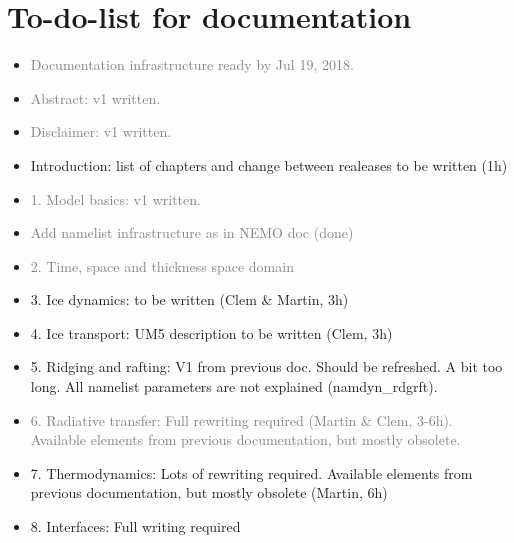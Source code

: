 \documentclass[../main/SI3_manual]{subfiles}
\begin{document}

\chapter*{To-do-list for documentation}
\label{chap:TDL}

\begin{itemize}

\item \textcolor{gray}{Documentation infrastructure ready by Jul 19, 2018.}

\item \textcolor{gray}{Abstract: v1 written.}

\item \textcolor{gray}{Disclaimer: v1 written.}

\item Introduction: list of chapters and change between realeases to be written (1h)

\item \textcolor{gray}{1. Model basics: v1 written.}

\item \textcolor{gray}{Add namelist infrastructure as in NEMO doc (done)}

\item \textcolor{gray}{2. Time, space and thickness space domain}

\item 3. Ice dynamics: to be written (Clem \& Martin, 3h)

\item 4. Ice transport: UM5 description to be written (Clem, 3h)

\item 5. Ridging and rafting: V1 from previous doc. Should be refreshed. A bit too long. All namelist parameters are not explained (namdyn\_rdgrft).

\item \textcolor{gray}{6. Radiative transfer: Full rewriting required (Martin \& Clem, 3-6h). Available elements from previous documentation, but mostly obsolete.}

\item 7. Thermodynamics: Lots of rewriting required. Available elements from previous documentation, but mostly obsolete (Martin, 6h)

\item 8. Interfaces: Full writing required 


\end{itemize}
\end{document}
